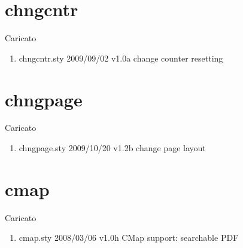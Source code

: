 \section{chngcntr}

Caricato 
\begin{enumerate}
\item chngcntr.sty 2009/09/02 v1.0a change counter resetting
\end{enumerate}
\section{chngpage}

Caricato 
\begin{enumerate}
\item chngpage.sty 2009/10/20 v1.2b change page layout
\end{enumerate}
\section{cmap}

Caricato 
\begin{enumerate}
\item cmap.sty 2008/03/06 v1.0h CMap support: searchable PDF
\end{enumerate}
\lstset{language=TeX}

